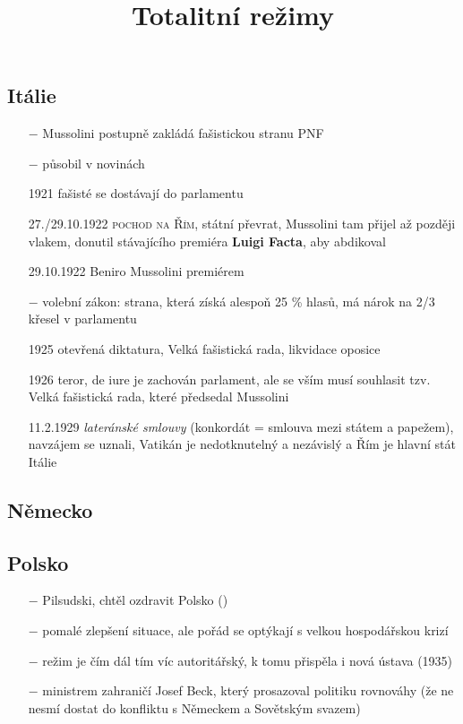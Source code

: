 \documentclass{article}
\title{\vspace{-2cm}Totalitní režimy\vspace{-1.7cm}}
\date{}
\author{}
\begin{document}
\maketitle

\subsection*{Itálie}
\begin{itemize}
    \vspace{-0.5em}
    \setlength\itemsep{0.15em}
    \item[$-$] Mussolini postupně zakládá fašistickou stranu PNF
    \item[$-$] působil v novinách
    \item[1921] fašisté se dostávají do parlamentu
    \item[27./29.10.1922] \textsc{pochod na Řím}, státní převrat, Mussolini tam přijel až později vlakem, donutil stávajícího premiéra \textbf{Luigi Facta}, aby abdikoval
    \item[29.10.1922] Beniro Mussolini premiérem
    \item[$-$] volební zákon: strana, která získá alespoň 25 \% hlasů, má nárok na 2/3 křesel v parlamentu
    \item[1925] otevřená diktatura, Velká fašistická rada, likvidace oposice
    \item[1926] teror, de iure je zachován parlament, ale se vším musí souhlasit tzv. Velká fašistická rada, které předsedal Mussolini
    \item[11.2.1929] \textit{lateránské smlouvy} (konkordát = smlouva mezi státem a papežem), navzájem se uznali, Vatikán je nedotknutelný a nezávislý a Řím je hlavní stát Itálie
\end{itemize}

\subsection*{Německo}

\subsection*{Polsko}
\begin{itemize}
    \vspace{-0.5em}
    \setlength\itemsep{0.15em}
    \item[$-$] Pilsudski, chtěl ozdravit Polsko ()
    \item[$-$] pomalé zlepšení situace, ale pořád se optýkají s velkou hospodářskou krizí
    \item[$-$] režim je čím dál tím víc autoritářský, k tomu přispěla i nová ústava (1935)
    \item[$-$] ministrem zahraničí Josef Beck, který prosazoval politiku rovnováhy (že ne nesmí dostat do konfliktu s Německem a Sovětským svazem)
\end{itemize}
\end{document}
